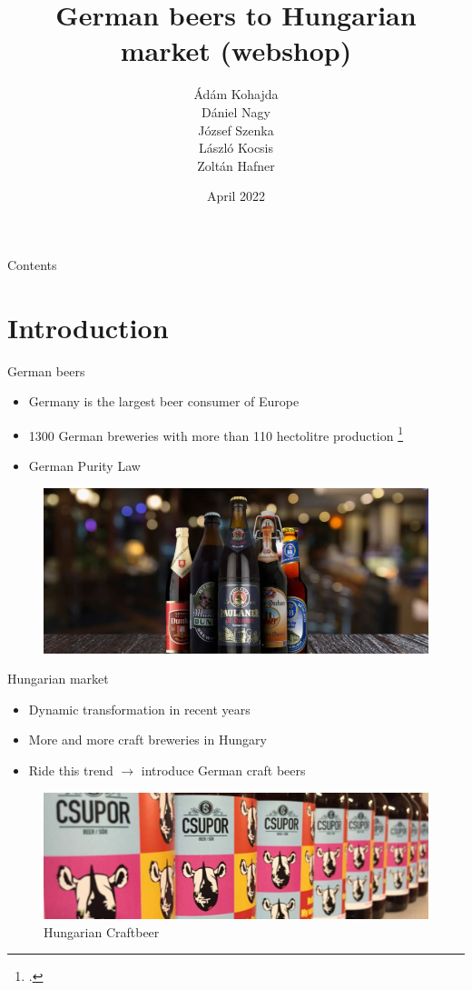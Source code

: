 \documentclass[aspectratio=43]{beamer}
\title[Group Assignment] %
{German beers to Hungarian market (webshop)}
\subtitle{}
\author[Marketing]
{Ádám Kohajda \\ Dániel Nagy \\ József Szenka \\ László Kocsis \\ Zoltán Hafner}
\date[April 2022] %
{April 2022}
\begin{document}
\begin{frame}[plain]
    \titlepage
\end{frame}

\begin{frame}{Contents}
   \tableofcontents
\end{frame}


\section{Introduction}

\begin{frame}{German beers}
\begin{itemize}
   \item Germany is the largest beer consumer of Europe
   \item 1300 German breweries with more than 110 hectolitre production \footcite{statista1}
   \item German Purity Law
\end{itemize}

\begin{figure}[H]
  \centering
  \includegraphics[width=0.6\linewidth]{pics/german_beer.png}
\end{figure}

\end{frame}

\begin{frame}{Hungarian market}
\begin{itemize}
   \item Dynamic transformation in recent years
   \item More and more craft breweries in Hungary
   \item Ride this trend $\rightarrow$ introduce German craft beers
\end{itemize}

\begin{figure}[H]
  \centering
  \includegraphics[width=0.85\linewidth]{pics/hungarianCraft.jpg}
  \caption*{Hungarian Craftbeer}
\end{figure}

\end{frame}
\end{document}

